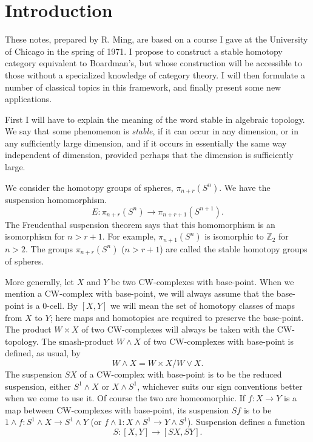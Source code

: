 \documentclass[../main]{subfiles}
\begin{document}
\chapter{Introduction}%
\label{sec:p3c01}
These notes, prepared by R. Ming, are based on a course I gave at the University of Chicago in the spring of 1971. I propose to construct a stable homotopy category equivalent to Boardman's, but whose construction will be accessible to those without a specialized knowledge of category theory. I will then formulate a number of classical topics in this framework, and finally present some new applications. 

First I will have to explain the meaning of the word stable in algebraic topology. We say that some phenomenon is \emph{stable}, if it can occur in any dimension, or in any sufficiently large dimension, and if it occurs in essentially the same way independent of dimension, provided perhaps that the dimension is sufficiently large.

\begin{example_different}
    We consider the homotopy groups of spheres, $\pi_{n + r}(S^n)$. We have the suspension homomorphism.
    \[ E \colon \pi_{n + r}(S^n) \to \pi_{n + r + 1}(S^{n + 1}). \]
    The Freudenthal suspension theorem says that this homomorphism is an isomorphism for $n > r + 1$. For example, $\pi_{n + 1}(S^n)$ is isomorphic to $\mathbb Z_2$ for $n > 2$. The groups $\pi_{n + r}(S^n)$ ($n > r + 1$) are called the stable homotopy groups of spheres.
\end{example_different}

More generally, let $X$ and $Y$ be two CW-complexes with base-point. When we mention a CW-complex with base-point, we will always assume that the base-point is a $0$-cell. By $[X, Y]$ we will mean the set of homotopy classes of maps from $X$ to $Y$; here maps and homotopies are required to preserve the base-point. The product $W \times X$ of two CW-complexes will always be taken with the CW-topology. The smash-product $W \wedge X$ of two CW-complexes with base-point is defined, as usual, by 
\[ W \wedge X = W \times X/W \vee X .\]
The suspension $SX$ of a CW-complex with base-point is to be the reduced suspension, either $S^1 \wedge X$ or $X \wedge S^1$, whichever suits our sign conventions better when we come to use it. Of course the two are homeomorphic. If $f \colon X \to Y$ is a map between CW-complexes with base-point, its suspension $Sf$ is to be $1 \wedge f \colon S^1 \wedge X \to S^1 \wedge Y$ (or $f \wedge 1 \colon X \wedge S^1 \to Y \wedge S^1$). Suspension defines a function 
\[ S \colon [X, Y] \to [SX, SY] .\]
\end{document}
